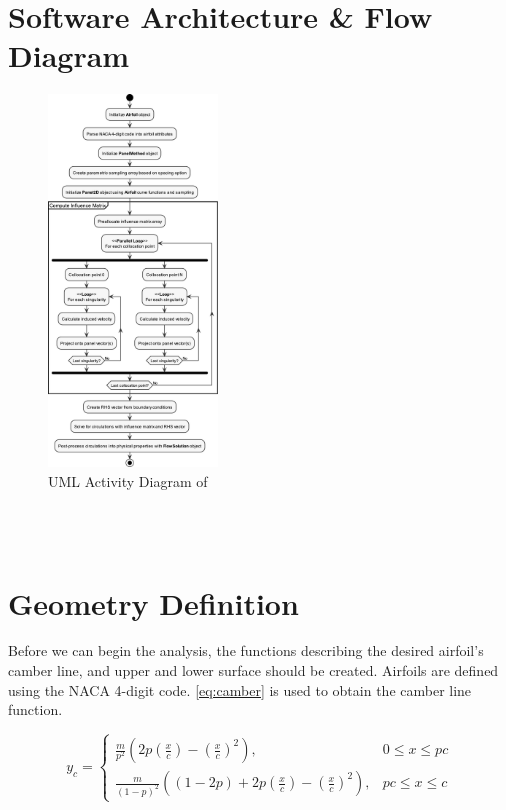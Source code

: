 \section{Software Architecture \& Flow Diagram}
\begin{figure}
    \vspace{-2em}
    \begin{center}
      \includegraphics[width=0.40\textwidth]{static/activity_diagram.pdf}
    \end{center}
    \caption{UML Activity Diagram of \gammapy}
    \label{fig:activity}
\end{figure}

\blindtext\\

\blindtext\\

\section{Geometry Definition}
Before we can begin the analysis, the functions describing the desired airfoil's
camber line, and upper and lower surface should be created. Airfoils are defined
using the NACA 4-digit code. \autoref{eq:camber} is used to obtain the camber
line function.

\begin{equation}
\label{eq:camber}
    y_{c}=\left\{
        \begin{array}{ll}
            \frac{m}{p^{2}}\left(2 p\left(\frac{x}{c}\right)-\left(\frac{x}{c}\right)^{2}\right),
            & 0 \leq x \leq p c \\
            \frac{m}{(1-p)^{2}}\left((1-2 p)+2 p\left(\frac{x}{c}\right)-\left(\frac{x}{c}\right)^{2}\right),
            & p c \leq x \leq c
        \end{array}\right.
\end{equation}
\medskip


